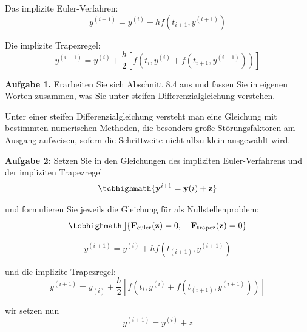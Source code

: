 Das implizite Euler-Verfahren:
\begin{equation}
	 y^{(i+1)} = y^{(i)} + hf\left(t_{i+1},y^{(i+1)}\right) 
\end{equation}


Die implizite Trapezregel:
\begin{equation}
	y^{(i+1)} = y^{(i)} + \frac{h}{2}\left[f\left(t_i, y^{(i)} + f(t_{i+1},y^{(i+1)})\right)\right] 
\end{equation}

\begin{mybox}
\textbf{Aufgabe 1.}	
	Erarbeiten Sie sich Abschnitt 8.4 aus \cite{Atkinson.2004} und fassen Sie in eigenen Worten zusammen, was Sie unter steifen Differenzialgleichung verstehen.
\end{mybox}

	Unter einer steifen Differenzialgleichung versteht man eine Gleichung mit bestimmten numerischen Methoden, die besonders große Störungsfaktoren am Ausgang aufweisen, sofern die Schrittweite nicht allzu klein ausgewählt wird.




\begin{mybox}
	\textbf{Aufgabe 2:}
	Setzen Sie in den Gleichungen des impliziten Euler-Verfahrens und der impliziten Trapezregel
	\begin{equation*}
	\tcbhighmath{\mathbf{y}^{i+1} = \mathbf{y}(i) + \mathbf{z}}  
	\end{equation*}
	
	und formulieren Sie jeweils die Gleichung für  als Nullstellenproblem:
	\begin{equation*}
		\tcbhighmath[]{\mathbf{F}_{\mathrm{euler}}(\mathbf{z}) = 0,\quad \mathbf{F}_{\mathrm{trapez}}(\mathbf{z}) = 0}   
	\end{equation*}
	
\end{mybox}


\begin{equation}
 	y^{(i+1)} = y^{(i)} + hf\left(t_{(i+1)},y^{(i+1)}\right) 
\end{equation}


und die implizite Trapezregel:
\begin{equation}
	 y^{(i+1)} = y_{(i)} + \dfrac{h}{2}\left[f\left(t_i, y^{(i)} + f\left(t_{(i+1)},y^{(i+1)}\right)\right)\right] 
\end{equation}

wir setzen nun
\begin{equation}
	 y^{(i+1)} = y^{(i)} + z 
\end{equation}


